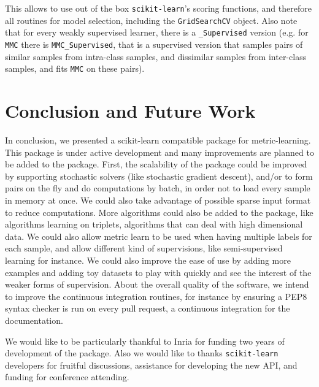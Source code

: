 \documentclass[twoside,11pt]{article}
\begin{document}
This allows to use out of the box \texttt{scikit-learn}'s scoring functions, and therefore all routines for model selection, including the \texttt{GridSearchCV} object. Also note that for every weakly supervised learner, there is a \texttt{\_Supervised} version (e.g. for \texttt{MMC} there is \texttt{MMC\_Supervised}, that is a supervised version that samples pairs of similar samples from intra-class samples, and dissimilar samples from inter-class samples, and fits \texttt{MMC} on these pairs).



\section{Conclusion and Future Work}


In conclusion, we presented a scikit-learn compatible package for metric-learning. This package is under active development and many improvements are planned to be added to the package. First, the scalability of the package could be improved by supporting stochastic solvers (like stochastic gradient descent), and/or to form pairs on the fly and do computations by batch, in order not to load every sample in memory at once. We could also take advantage of possible sparse input format to reduce computations. More algorithms could also be added to the package, like algorithms learning on triplets, algorithms that can deal with high dimensional data. We could also allow metric learn to be used when having multiple labels for each sample, and allow different kind of supervisions, like semi-supervised learning for instance. We could also improve the ease of use by adding more examples and adding toy datasets to play with quickly and see the interest of the weaker forms of supervision. About the overall quality of the software, we intend to improve the continuous integration routines, for instance by ensuring a PEP8 syntax checker is run on every pull request, a continuous integration for the documentation.

\acks

We would like to be particularly thankful to Inria for funding two years of development of the package. Also we would like to thanks \texttt{scikit-learn} developers for fruitful discussions, assistance for developing the new API, and funding for conference attending.




\end{document}
